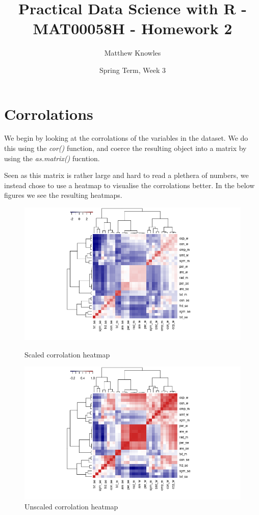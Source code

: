 \documentclass{amsart}
\title{Practical Data Science with R - MAT00058H - Homework 2}
\author{Matthew Knowles}
\date{Spring Term, Week 3}
\begin{document}
\maketitle

\section{Corrolations}
We begin by looking at the corrolations of the variables in the dataset. We do this using the \textit{cor()} function, and coerce the resulting object into a matrix by using the \textit{as.matrix()} fucntion.

Seen as this matrix is rather large and hard to read a plethera of numbers, we instead chose to use a heatmap to visualise the corrolations better. In the below figures we see the resulting heatmaps.
\\
\begin{figure}[h]
    \centering
    \begin{minipage}[b]{0.45\textwidth}
        \includegraphics[width=\textwidth]{../../figs/hw2/heatmap1.png}
        \caption{Scaled corrolation heatmap}
    \end{minipage}
    \hfill
    \centering
    \begin{minipage}[b]{0.45\textwidth}
        \includegraphics[width=\textwidth]{../../figs/hw2/heatmap2.png}
        \caption{Unscaled corrolation heatmap}
    \end{minipage}
\end{figure}
\end{document}
